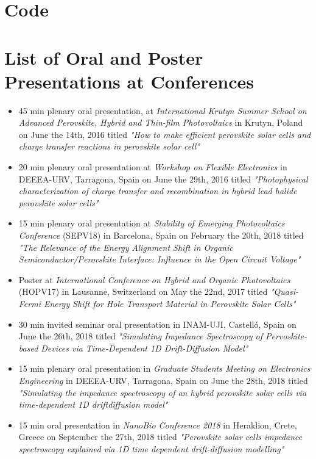\documentclass[b5paper, 12pt, openright]{book} %
\begin{document}
	\appendix

\chapter{Code}
	\label{ch:code}
	\graphicspath{ {./contents_img/code/} }
	


	\printindex

\chapter*{List of Oral and Poster Presentations at Conferences}
	\begin{itemize}
		\item 45 min plenary oral presentation, at \textit{International Krutyn Summer School on Advanced Perovskite, Hybrid and Thin-film Photovoltaics} in Krutyn, Poland on June the 14th, 2016 titled \textit{"How to make efficient perovskite solar cells and charge transfer reactions in perovskite solar cell"}
		\item 20 min plenary oral presentation at \textit{Workshop on Flexible Electronics} in DEEEA-URV, Tarragona, Spain on June the 29th, 2016 titled \textit{"Photophysical characterization of charge transfer and recombination in hybrid lead halide perovskite solar cells"}
		\item 15 min plenary oral presentation at \textit{Stability of Emerging Photovoltaics Conference} (SEPV18) in Barcelona, Spain on February the 20th, 2018 titled \textit{"The Relevance of the Energy Alignment Shift in Organic Semiconductor/Perovskite Interface: Influence in the Open Circuit Voltage"}
		\item Poster at \textit{International Conference on Hybrid and Organic Photovoltaics} (HOPV17) in Lausanne, Switzerland on May the 22nd, 2017 titled \textit{"Quasi-Fermi Energy Shift for Hole Transport Material in Perovskite Solar Cells"}
		\item 30 min invited seminar oral presentation in INAM-UJI, Castelló, Spain on June the 26th, 2018 titled \textit{"Simulating Impedance Spectroscopy of Pervoskite-based Devices via Time-Dependent 1D Drift-Diffusion Model"}
		\item 15 min plenary oral presentation in \textit{Graduate Students Meeting on Electronics Engineering} in DEEEA-URV, Tarragona, Spain on June the 28th, 2018 titled \textit{"Simulating the impedance spectroscopy of an hybrid perovskite solar cells via time-dependent 1D driftdiffusion model"}
		\item 15 min oral presentation in \textit{NanoBio Conference 2018} in Heraklion, Crete, Greece on September the 27th, 2018 titled \textit{"Perovskite solar cells impedance spectroscopy explained via 1D time dependent drift-diffusion modelling"}
	\end{itemize}

	\printbibliography[category=mypapers, title=List of Publications]

	\printbibliography[notcategory=mypapers]
\end{document}
